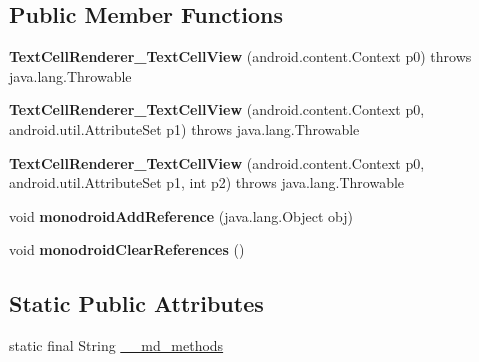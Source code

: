 \subsection*{Public Member Functions}
\begin{DoxyCompactItemize}
\item 
\mbox{\label{classmd5b60ffeb829f638581ab2bb9b1a7f4f3f_1_1TextCellRenderer__TextCellView_afe6c7e7e2a7fabcc9de2be5e1213ec39}} 
{\bfseries Text\+Cell\+Renderer\+\_\+\+Text\+Cell\+View} (android.\+content.\+Context p0)  throws java.\+lang.\+Throwable 	
\item 
\mbox{\label{classmd5b60ffeb829f638581ab2bb9b1a7f4f3f_1_1TextCellRenderer__TextCellView_ad18530bfd08906cd61bff0c0f121c982}} 
{\bfseries Text\+Cell\+Renderer\+\_\+\+Text\+Cell\+View} (android.\+content.\+Context p0, android.\+util.\+Attribute\+Set p1)  throws java.\+lang.\+Throwable 	
\item 
\mbox{\label{classmd5b60ffeb829f638581ab2bb9b1a7f4f3f_1_1TextCellRenderer__TextCellView_a4091a02a6c6480481b17fb51db97a2cc}} 
{\bfseries Text\+Cell\+Renderer\+\_\+\+Text\+Cell\+View} (android.\+content.\+Context p0, android.\+util.\+Attribute\+Set p1, int p2)  throws java.\+lang.\+Throwable 	
\item 
\mbox{\label{classmd5b60ffeb829f638581ab2bb9b1a7f4f3f_1_1TextCellRenderer__TextCellView_afc8a91c0d40ccce034289e75cb64e36a}} 
void {\bfseries monodroid\+Add\+Reference} (java.\+lang.\+Object obj)
\item 
\mbox{\label{classmd5b60ffeb829f638581ab2bb9b1a7f4f3f_1_1TextCellRenderer__TextCellView_a8a90317f45055f6bdc8b99196ff5d3c5}} 
void {\bfseries monodroid\+Clear\+References} ()
\end{DoxyCompactItemize}
\subsection*{Static Public Attributes}
\begin{DoxyCompactItemize}
\item 
static final String \hyperlink{classmd5b60ffeb829f638581ab2bb9b1a7f4f3f_1_1TextCellRenderer__TextCellView_a00b3617596bc3d87d289d2fa7895a853}{\+\_\+\+\_\+md\+\_\+methods}
\end{DoxyCompactItemize}
